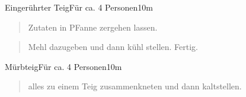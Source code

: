 \documentclass[
  a4paper,
]{article}
\begin{document}
\newpage

\begin{recipe}{Eingerührter Teig}{Für ca. 4 Personen}{10m}


\begin{quote}
Zutaten in PFanne zergehen lassen.
\end{quote}

\freeform\hrulefill


\begin{quote}
Mehl dazugeben und dann kühl stellen. Fertig.
\end{quote}

\freeform\hrulefill\newline{}\end{recipe}

\newpage

\begin{recipe}{Mürbteig}{Für ca. 4 Personen}{10m}


\begin{quote}
alles zu einem Teig zusammenkneten und dann kaltstellen.
\end{quote}

\freeform\hrulefill\newline{}\end{recipe}

\newpage
\end{document}
